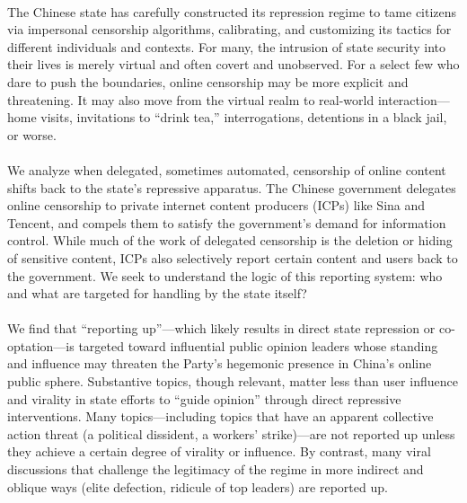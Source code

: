 \documentclass[12pt]{article}
\begin{document}
\begin{CJK*}{UTF8}{gbsn}
\paragraph{} The Chinese state has carefully constructed its repression regime to tame citizens via impersonal censorship algorithms, calibrating, and customizing its tactics for different individuals and contexts. For many, the intrusion of state security into their lives is merely virtual and often covert and unobserved. For a select few who dare to push the boundaries, online censorship may be more explicit and threatening. It may also move from the virtual realm to real-world interaction---home visits, invitations to ``drink tea,'' interrogations, detentions in a black jail, or worse.

\paragraph{} We analyze when delegated, sometimes automated, censorship of online content shifts back to the state's repressive apparatus. The Chinese government delegates online censorship to private internet content producers (ICPs) like Sina and Tencent, and compels them to satisfy the government's demand for information control. While much of the work of delegated censorship is the deletion or hiding of sensitive content, ICPs also selectively report certain content and users back to the government. We seek to understand the logic of this reporting system: who and what are targeted for handling by the state itself?
 
\paragraph{} We find that ``reporting up''---which likely results in direct state repression or co-optation---is targeted toward influential public opinion leaders whose standing and influence may threaten the Party's hegemonic presence in China's online public sphere. Substantive topics, though relevant, matter less than user influence and virality in state efforts to ``guide opinion'' through direct repressive interventions. Many topics---including topics that have an apparent collective action threat (a political dissident, a workers' strike)---are not reported up unless they achieve a certain degree of virality or influence. By contrast, many viral discussions that challenge the legitimacy of the regime in more indirect and oblique ways (elite defection, ridicule of top leaders) are reported up.
 

\end{CJK*}
\end{document}
